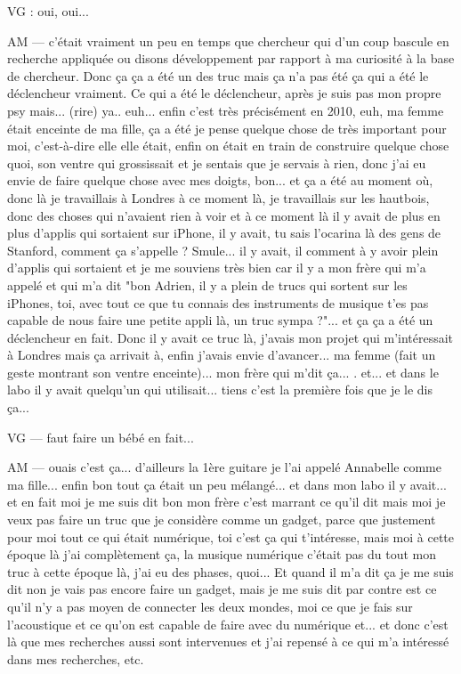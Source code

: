 VG  : oui, oui... 

AM — c'était vraiment un peu en temps que chercheur qui d'un coup bascule en recherche appliquée ou disons développement par rapport à ma curiosité à la base de chercheur. Donc ça ça a été un des truc mais ça n'a pas été ça qui a été le déclencheur vraiment.
Ce qui a été le déclencheur, après je suis pas mon propre psy mais... (rire) ya.. euh... enfin c'est très précisément en 2010, euh, ma femme était enceinte de ma fille, ça a été je pense  quelque chose de très important pour moi, c'est-à-dire elle elle était, enfin on était en train de construire quelque chose quoi, son ventre qui grossissait et je sentais que je servais à rien, donc j'ai eu envie de faire quelque chose avec mes doigts, bon... 
et ça a été au moment où, donc là je travaillais à Londres à ce moment là, je travaillais sur les hautbois, donc des choses qui n'avaient rien à voir et à ce moment là il y avait de plus en plus d'applis qui sortaient sur iPhone, il y avait, tu sais l'ocarina là des gens de Stanford, comment ça s'appelle ? Smule... il y avait, il comment à y avoir plein d'applis qui sortaient et je me souviens très bien car il y a mon frère qui m'a appelé et qui m'a dit "bon Adrien, il y a plein de trucs qui sortent sur les iPhones, toi, avec tout ce que tu connais des instruments de musique t'es pas capable de nous faire une petite appli là, un truc sympa ?"... et ça ça a été un déclencheur en fait.
Donc il y avait ce truc là, j'avais mon projet qui m'intéressait à Londres mais ça arrivait à, enfin j'avais envie d'avancer... ma femme (fait un geste montrant son ventre enceinte)... mon frère qui m'dit ça... . et... et dans le labo il y avait quelqu'un qui utilisait... tiens c'est la première fois que je le dis ça... 

VG — faut faire un bébé en fait... 

AM — ouais c'est ça... d'ailleurs la 1ère guitare je l'ai appelé Annabelle comme ma fille... enfin bon tout ça était un peu mélangé... 
et dans mon labo il y avait... et en fait moi je me suis dit bon mon frère c'est marrant ce qu'il dit mais moi je veux pas faire un truc que je considère comme un gadget, parce que justement pour moi tout ce qui était numérique, toi c'est ça qui t'intéresse, mais moi à cette époque là j'ai complètement ça, la musique numérique c'était pas du  tout mon truc à cette époque là, j'ai eu des phases, quoi... Et quand il m'a dit ça je me suis dit non je vais pas encore faire un gadget,  mais je me suis dit par contre est ce qu'il n'y a pas moyen de connecter les deux mondes, moi ce que je fais sur l'acoustique et ce qu'on est capable de faire avec du numérique et... et donc c'est là que mes recherches aussi sont intervenues et j'ai repensé à ce qui m'a intéressé dans mes recherches, etc.

